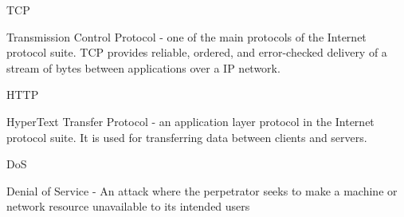 \documentclass[]{plan}
\begin{document}
TCP

Transmission Control Protocol - one of the main protocols of the Internet protocol suite. TCP provides
reliable, ordered, and error-checked delivery of a stream of bytes between applications over a IP network.

HTTP

HyperText Transfer Protocol - an application layer protocol in the Internet protocol suite.
It is used for transferring data between clients and servers.

DoS

Denial of Service - An attack where the perpetrator seeks to make a machine or network resource unavailable
to its intended users




\end{document}
